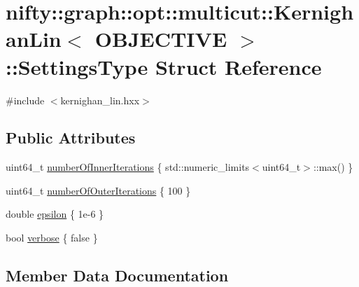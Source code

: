 \hypertarget{structnifty_1_1graph_1_1opt_1_1multicut_1_1KernighanLin_1_1SettingsType}{}\section{nifty\+:\+:graph\+:\+:opt\+:\+:multicut\+:\+:Kernighan\+Lin$<$ O\+B\+J\+E\+C\+T\+I\+VE $>$\+:\+:Settings\+Type Struct Reference}
\label{structnifty_1_1graph_1_1opt_1_1multicut_1_1KernighanLin_1_1SettingsType}


{\ttfamily \#include $<$kernighan\+\_\+lin.\+hxx$>$}

\subsection*{Public Attributes}
\begin{DoxyCompactItemize}
\item 
uint64\+\_\+t \hyperlink{structnifty_1_1graph_1_1opt_1_1multicut_1_1KernighanLin_1_1SettingsType_a9d910d9d5aebcf1f79b5e90707b9d237}{number\+Of\+Inner\+Iterations} \{ std\+::numeric\+\_\+limits$<$uint64\+\_\+t$>$\+::max() \}
\item 
uint64\+\_\+t \hyperlink{structnifty_1_1graph_1_1opt_1_1multicut_1_1KernighanLin_1_1SettingsType_a1a7ff5b9b9401b5ede917be02dd81144}{number\+Of\+Outer\+Iterations} \{ 100 \}
\item 
double \hyperlink{structnifty_1_1graph_1_1opt_1_1multicut_1_1KernighanLin_1_1SettingsType_a92a8f6e4a07164fe6e74a5a44118ce45}{epsilon} \{ 1e-\/6 \}
\item 
bool \hyperlink{structnifty_1_1graph_1_1opt_1_1multicut_1_1KernighanLin_1_1SettingsType_ad2060a212e720e3bd256717325a963ba}{verbose} \{ false \}
\end{DoxyCompactItemize}


\subsection{Member Data Documentation}
\mbox{\label{structnifty_1_1graph_1_1opt_1_1multicut_1_1KernighanLin_1_1SettingsType_a92a8f6e4a07164fe6e74a5a44118ce45}} 
